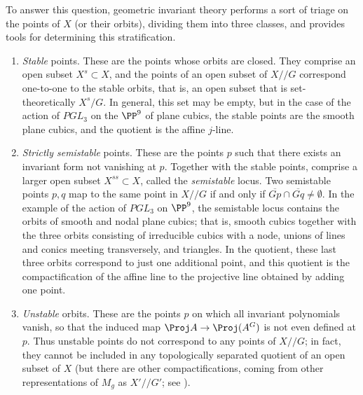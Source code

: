 To answer this question, geometric invariant theory performs a sort of triage on the points of $X$ (or their orbits), dividing them into three classes,
and provides tools for determining this stratification. 
\begin{enumerate}


\item  \emph{Stable} points. These are the points whose orbits are closed. They comprise an open subset $X^s \subset X$, and the points of an open subset of $X//G$ correspond one-to-one to the stable orbits, that is, an open subset that is set-theoretically $X^s/G$. In general, this set may be empty, but in the case of the action of $PGL_3$ on the $\PP^9$ of plane cubics, the stable points are the smooth plane cubics, and the quotient is the affine $j$-line.

\item \emph{Strictly semistable} points. These are the points $p$ such that there exists an invariant form not vanishing at $p$.  Together with the stable points, comprise a larger open subset $X^{ss} \subset X$, called the \emph{semistable} locus. Two  semistable points $p,q$ map to the same point in $X//G$ if and only if $\overline{Gp}\cap \overline{Gq} \neq \emptyset$. In the example of the action of $PGL_3$ on  $\PP^9$, the semistable  locus contains  the orbits of smooth and nodal plane cubics; that is, smooth cubics together with the three orbits consisting of irreducible cubics with a node, unions of lines and conics meeting transversely, and triangles. In the quotient, these last three orbits correspond to just one additional point, and this quotient is the compactification of the affine line to the projective line obtained by adding one point.

\item  \emph{Unstable} orbits. These are the points $p$ on which all invariant polynomials vanish, so that the induced map
$\Proj A \to \Proj (A^G)$ is not even defined at $p$. Thus unstable points do not correspond to any points of $X//G$; in fact, they cannot be included in any topologically separated quotient of an open subset of $X$ (but there are other compactifications, coming from
other representations of $M_g$ as $X'//G'$; see \cite{MR3044128}).
\end{enumerate}

